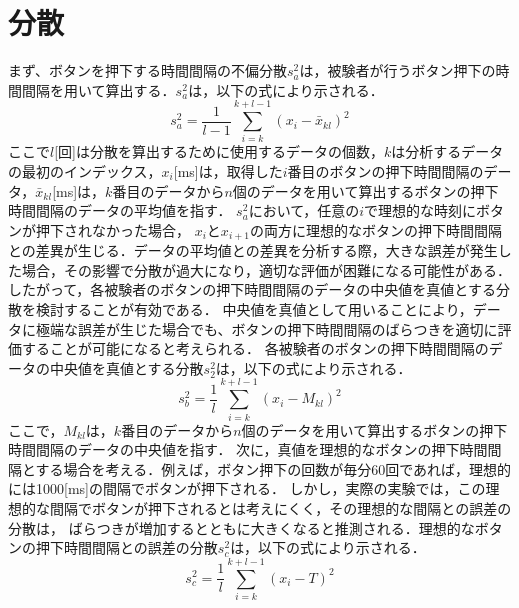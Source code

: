 \section{分散}
まず、ボタンを押下する時間間隔の不偏分散$s^2_{a}$は，被験者が行うボタン押下の時間間隔を用いて算出する．$s^2_{a}$は，以下の式により示される．
\begin{equation}
  s^2_a = \frac{1}{l-1} \sum_{i=k}^{k+l-1} (x_i - \bar{x}_{kl})^2
\end{equation}
ここで$l$[回]は分散を算出するために使用するデータの個数，$k$は分析するデータの最初のインデックス，$x_{i}$[ms]は，取得した$i$番目のボタンの押下時間間隔のデータ，$\bar{x}_{kl}$[ms]は，$k$番目のデータから$n$個のデータを用いて算出するボタンの押下時間間隔のデータの平均値を指す．
$s^2_{a}$において，任意の$i$で理想的な時刻にボタンが押下されなかった場合，
$x_{i}$と$x_{i+1}$の両方に理想的なボタンの押下時間間隔との差異が生じる．データの平均値との差異を分析する際，大きな誤差が発生した場合，その影響で分散が過大になり，適切な評価が困難になる可能性がある．したがって，各被験者のボタンの押下時間間隔のデータの中央値を真値とする分散を検討することが有効である．
中央値を真値として用いることにより，データに極端な誤差が生じた場合でも、ボタンの押下時間間隔のばらつきを適切に評価することが可能になると考えられる．
各被験者のボタンの押下時間間隔のデータの中央値を真値とする分散$s^2_{2}$は，以下の式により示される．
\begin{equation}
  s^2_b = \frac{1}{l} \sum_{i=k}^{k+l-1} (x_i - M_{kl})^2
\end{equation}
ここで，$M_{kl}$は，$k$番目のデータから$n$個のデータを用いて算出するボタンの押下時間間隔のデータの中央値を指す．
次に，真値を理想的なボタンの押下時間間隔とする場合を考える．例えば，ボタン押下の回数が毎分60回であれば，理想的には1000[ms]の間隔でボタンが押下される．
しかし，実際の実験では，この理想的な間隔でボタンが押下されるとは考えにくく，その理想的な間隔との誤差の分散は，
ばらつきが増加するとともに大きくなると推測される．理想的なボタンの押下時間間隔との誤差の分散$s^2_{c}$は，以下の式により示される．
\begin{equation}
  s^2_c = \frac{1}{l} \sum_{i=k}^{k+l-1} (x_i - T)^2
\end{equation}
